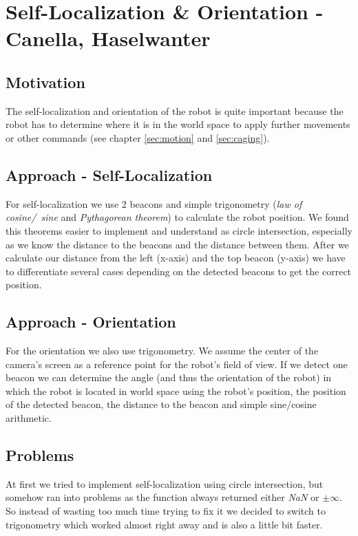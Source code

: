 \documentclass[703031]{iisreport}
\begin{document}
\section{Self-Localization \& Orientation -\\ Canella, Haselwanter}
\label{sec:localization}
\subsection{Motivation}
The self-localization and orientation of the robot is quite important because the robot has to determine where it is in the world space to apply further movements or other commands (see chapter \ref{sec:motion} and \ref{sec:caging}).

\subsection{Approach - Self-Localization}
For self-localization we use 2 beacons and simple trigonometry (\emph{law of \mbox{cosine}/\ sine} and \emph{Pythagorean theorem}) to calculate the robot position. We found this theorems easier to implement and understand as circle intersection, especially as we know the distance to the beacons and the distance between them. After we calculate our distance from the left (x-axis) and the top beacon (y-axis) we have to differentiate several cases depending on the detected beacons to get the correct position.

\subsection{Approach - Orientation}
For the orientation we also use trigonometry. We assume the center of the camera's screen as a reference point for the robot's field of view. If we detect one beacon we can determine the angle (and thus the orientation of the robot) in which the robot is located in world space using the robot's position, the position of the detected beacon, the distance to the beacon and simple sine/cosine arithmetic.

\subsection{Problems}
At first we tried to implement self-localization using circle intersection, but somehow ran into problems as the function always returned either \emph{NaN} or $\pm \infty$. So instead of wasting too much time trying to fix it we decided to switch to trigonometry which worked almost right away and is also a little bit faster.
\end{document}

